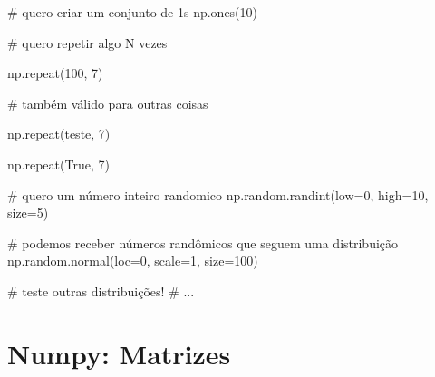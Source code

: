 \documentclass[
  letterpaper,
  DIV=11,
  numbers=noendperiod]{scrreprt}
\newenvironment{Shaded}{\begin{snugshade}}{\end{snugshade}}
\newcommand{\NormalTok}[1]{\textcolor[rgb]{0.00,0.23,0.31}{#1}}
\begin{document}
\begin{Shaded}
\begin{Highlighting}[]
\NormalTok{\# quero criar um conjunto de 1s}
\NormalTok{np.ones(10)}
\end{Highlighting}
\end{Shaded}

\begin{Shaded}
\begin{Highlighting}[]
\NormalTok{\# quero repetir algo N vezes}

\NormalTok{np.repeat(100, 7)}
\end{Highlighting}
\end{Shaded}

\begin{Shaded}
\begin{Highlighting}[]
\NormalTok{\# também válido para outras coisas}

\NormalTok{np.repeat(\textquotesingle{}teste\textquotesingle{}, 7)}
\end{Highlighting}
\end{Shaded}

\begin{Shaded}
\begin{Highlighting}[]
\NormalTok{np.repeat(True, 7)}
\end{Highlighting}
\end{Shaded}

\begin{Shaded}
\begin{Highlighting}[]
\NormalTok{\# quero um número inteiro randomico}
\NormalTok{np.random.randint(low=0, high=10, size=5)}
\end{Highlighting}
\end{Shaded}

\begin{Shaded}
\begin{Highlighting}[]
\NormalTok{\# podemos receber números randômicos que seguem uma distribuição }
\NormalTok{np.random.normal(loc=0, scale=1, size=100)}
\end{Highlighting}
\end{Shaded}

\begin{Shaded}
\begin{Highlighting}[]
\NormalTok{\# teste outras distribuições!}
\NormalTok{\# ...}
\end{Highlighting}
\end{Shaded}

\section{Numpy: Matrizes}\label{numpy-matrizes}
\end{document}

